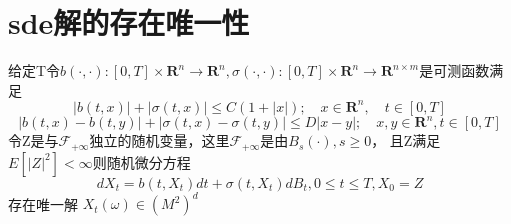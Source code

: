 \documentclass{article}%
\begin{document}
	\section{sde解的存在唯一性}给定T令$b(\cdot, \cdot):[0, T] \times \mathbf{R}^{n} \rightarrow \mathbf{R}^{n}, \sigma(\cdot, \cdot):[0, T] \times \mathbf{R}^{n} \rightarrow \mathbf{R}^{n \times m}$是可测函数满足
		\begin{equation}
		|b(t, x)|+|\sigma(t, x)| \leq C(1+|x|) ; \quad x \in \mathbf{R}^{n}, \quad t \in[0, T]
		\end{equation}
		\begin{equation}
		|b(t, x)-b(t, y)|+|\sigma(t, x)-\sigma(t, y)| \leq D|x-y| ; \quad x, y \in \mathbf{R}^{n}, t \in[0, T]
		\end{equation}
		令Z是与$\mathcal{F}_{+\infty}$独立的随机变量，这里$\mathcal{F}_{+\infty}$是由$B_s(\cdot),s\geq0$，
		且Z满足$E[|Z|^2]<\infty$则随机微分方程
		\begin{equation}
dX_t=b(t,X_t)dt+\sigma(t,X_t)dB_t,   0\leq t\leq T,X_0=Z
\end{equation}
存在唯一解
$X_t(\omega)\in(M^2)^d$
\end{document}
